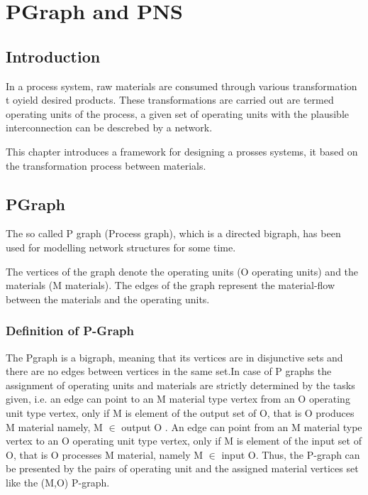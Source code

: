 
\chapter{\label{cha:pgraph}PGraph and PNS}

 
\section{Introduction}


In a process system, raw materials are consumed through various transformation t oyield desired products. These transformations are carried out are termed operating units of the process, a given set of operating units with the plausible interconnection can be descrebed by a network.\cite{omacs0}

This chapter introduces a framework for  designing  a prosses systems, it based on the transformation process between materials.

\section{PGraph}


The so called P graph (Process graph), which is a directed bigraph, 
has been used for modelling network structures for some time.

The vertices of the graph denote the operating units (O operating units) and the materials (M materials).
The edges of the graph represent the material-flow between the materials and the operating units\cite{pns2, pns4}. 

\subsection{Definition of P-Graph}

The Pgraph is a bigraph, meaning that its vertices are in disjunctive sets 
and there are no edges between vertices in the same set.In case of P graphs the assignment of operating units and materials are strictly determined by the tasks given, i.e. an edge can point to an M material type vertex 
from an O operating unit type vertex, only if M is element of the output set of O, 
that is O produces M material namely, M $\in$ output O \cite{pns2}. 
An edge can point from an M material type vertex to an O operating unit type vertex, 
only if M is element of the input set of O, that is O processes M material, namely M  $\in$ input O. Thus, the P-graph can be presented by the pairs of operating unit and the assigned material vertices set like the (M,O) P-graph\cite{pns2}.

